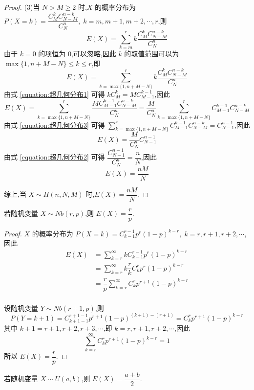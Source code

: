 \begin{proof}
    (3)当 $N>M \geqslant 2$ 时,$X$ 的概率分布为 $P(X=k) = \dfrac{C_M^k C_{N-M}^{n-k}}{C_N^n},\; k = m, m+1, m+2, \cdots, r$,则
    $$
    E(X) = \sum_{k=m}^r k \dfrac{C_M^k C_{N-M}^{n-k}}{C_N^n}
    $$
    由于 $k=0$ 的项恒为 $0$,可以忽略,因此 $k$ 的取值范围可以为 $\max\{ 1, n+M-N \} \leqslant k \leqslant r$,即
    $$
    E(X) = \sum_{k=\max\{ 1, n+M-N \}}^r k \dfrac{C_M^k C_{N-M}^{n-k}}{C_N^n}
    $$
    由式 \eqref{equation:超几何分布1} 可得 $k C_M^k = M C_{M-1}^{k-1}$,因此
    $$
    E(X) = \sum_{k=\max\{ 1, n+M-N \}}^{r} \dfrac{M C_{M-1}^{k-1} C_{N-M}^{n-k}}{C_N^n} = \dfrac{M}{C_N^n} \sum_{k=\max\{ 1, n+M-N \}}^{r} C_{M-1}^{k-1} C_{N-M}^{n-k}
    $$
    由式 \eqref{equation:超几何分布3} 可得 $\displaystyle\sum_{k=\max\{ 1, n+M-N \}}^{r} C_{M-1}^{k-1} C_{N-M}^{n-k} = C_{N-1}^{n-1}$,因此
    $$
    E(X) = \dfrac{M}{C_N^n} C_{N-1}^{n-1}
    $$
    由式 \eqref{equation:超几何分布2} 可得 $\dfrac{C_{N-1}^{n-1}}{C_N^n} = \dfrac{n}{N}$,因此
    $$
    E(X) = \dfrac{nM}{N}
    $$

    综上,当 $X \sim H(n,N,M)$ 时,$E(X) = \dfrac{nM}{N}$.
\end{proof}

\begin{conclusion}
    \indent 若随机变量 $X \sim Nb(r,p)$,则 $E(X) = \dfrac{r}{p}$.
\end{conclusion}

\begin{proof}
    $X$ 的概率分布为 $P(X=k) = C_{k-1}^{r-1} p^r (1-p)^{k-r},\; k = r, r+1, r+2, \cdots$,因此
    $$
    \begin{aligned}
        E(X) &= \sum_{k=r}^{\infty} k C_{k-1}^{r-1} p^r (1-p)^{k-r} \\
        &= \sum_{k=r}^{\infty} k \dfrac{r}{k} C_{k}^{r} p^r (1-p)^{k-r} \\
        &= \dfrac{r}{p} \sum_{k=r}^{\infty} C_{k}^{r} p^{r+1} (1-p)^{k-r} \\
    \end{aligned}
    $$

    设随机变量 $Y \sim Nb(r+1, p)$,则
    $$
    P(Y=k+1) = C_{k+1-1}^{r+1-1} p^{r+1} (1-p)^{(k+1)-(r+1)} = C_{k}^{r} p^{r+1} (1-p)^{k-r}
    $$
    其中 $k+1 = r+1, r+2, r+3, \cdots$,即 $k = r, r+1, r+2, \cdots$,因此
    $$
    \sum_{k=r}^{\infty} C_{k}^{r} p^{r+1} (1-p)^{k-r} = 1
    $$
    所以 $E(X) = \dfrac{r}{p}$.
\end{proof}

\begin{conclusion}
    \indent 若随机变量 $X \sim U(a,b)$,则 $E(X) = \dfrac{a+b}{2}$.
\end{conclusion}

